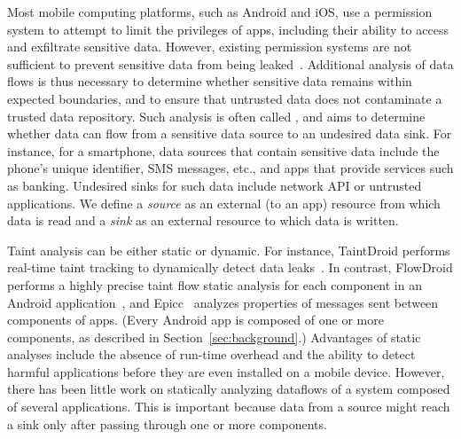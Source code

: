 Most mobile computing platforms, such as Android and iOS, use a
permission system to attempt to limit the privileges of apps, including their
ability to access and exfiltrate sensitive data. However, 
existing permission systems are not sufficient to prevent
sensitive data from being leaked~\cite{enck2010taintdroid}. Additional
analysis of data flows is
thus necessary to determine whether sensitive data remains within expected boundaries, and to ensure that untrusted data does
not contaminate a trusted data repository.  
Such analysis is often
called , and aims to determine whether data can flow
from a sensitive data source to an undesired data sink. For instance,
for a smartphone, data sources that contain sensitive data include
the phone's unique identifier, SMS messages, etc., and apps that provide
services such as banking.
Undesired sinks for such data include
network API or untrusted applications. 
We define a {\em source} as an external (to an app) resource from which data is read and a {\em sink} as an external resource to which data is written.

Taint analysis can be either static or dynamic. For instance,
TaintDroid performs real-time taint tracking to
dynamically detect data leaks~\cite{enck2010taintdroid}. In contrast, 
FlowDroid performs a highly precise taint flow static analysis
for each component in an  Android
application~\cite{FlowDroid-PLDI-2014,fritz2013thesis}, and Epicc~\cite{octeau2013effective}
analyzes properties of messages sent between components of apps.
(Every Android app is composed of one or more components, as described in Section~\ref{sec:background}.)
Advantages of static analyses include the absence of run-time overhead
and the ability to detect harmful applications before they are even
installed on a mobile device.
However, there has been little work on statically analyzing dataflows of a system
composed of several applications. This is important because 
data from a source might reach a sink only after passing through one or more components. 

